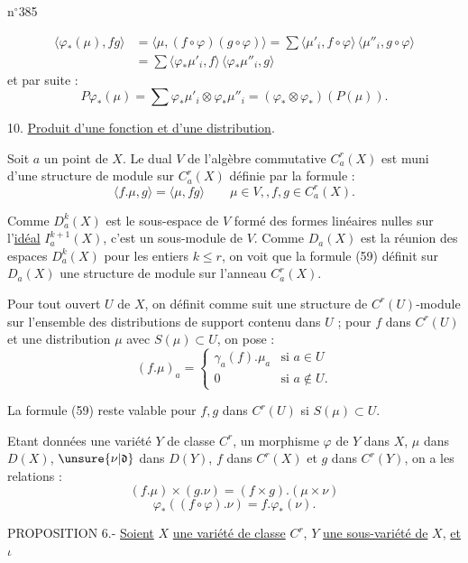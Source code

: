
n$^{\circ}$385

\[
\begin{aligned}
\langle\varphi_*(\mu),fg\rangle&=\langle\mu,(f\circ\varphi)(g\circ\varphi)\rangle=\sum\langle\mu'_i,f\circ\varphi\rangle\,\langle\mu''_i,g\circ\varphi\rangle\\
&=\sum\langle\varphi_*\mu'_i,f\rangle\,\langle\varphi_*\mu''_i,g\rangle
\end{aligned}
\]
et par suite :
\[
P\varphi_*(\mu)=\sum\varphi_*\mu'_i\otimes\varphi_*\mu''_i=(\varphi_*\otimes\varphi_*)(P(\mu)).
\]

10. \uline{Produit d'une fonction et d'une distribution}.

Soit $a$ un point de $X$. Le dual $V$ de l'algèbre commutative $C_a^r(X)$ est muni d'une structure de module sur $C_a^r(X)$ définie par la formule :
\[
\langle f.\mu,g\rangle=\langle\mu,fg\rangle\qquad\mu\in V,,f,g\in C_a^r(X).\tag*{(59)}
\]

Comme $D_a^k(X)$ est le sous-espace de $V$ formé des formes linéaires nulles sur l'\uline{idéal} $I_a^{k+1}(X)$, c'est un sous-module de $V$. Comme $D_a(X)$ est la réunion des espaces $D_a^k(X)$ pour les entiers $k\leq r$, on voit que la formule (59) définit sur $D_a(X)$ une structure de module sur l'anneau $C_a^r(X)$.

Pour tout ouvert $U$ de $X$, on définit comme suit une structure de $C^r(U)$-module sur l'ensemble des distributions de support contenu dans $U$ ; pour $f$ dans $C^r(U)$ et une distribution $\mu$ avec $S(\mu)\subset U$, on pose :
\[
(f.\mu)_a=\begin{cases}
\gamma_a(f).\mu_a & \text{si }a\in U\\
0 & \text{si }a\notin U.
\end{cases}
\]

La formule (59) reste valable pour $f,g$ dans $C^r(U)$ si $S(\mu)\subset U$.

Etant données une variété $Y$ de classe $C^r$, un morphisme $\varphi$ de $Y$ dans $X$, $\mu$ dans $D(X)$, $\unsure{\nu|\mathfrak{d}}$ dans $D(Y)$, $f$ dans $C^r(X)$ et $g$ dans $C^r(Y)$, on a les relations :
\[
(f.\mu)\times(g.\nu)=(f\times g).(\mu\times\nu)\tag*{(60)}
\]
\[
\varphi_*((f\circ\varphi).\nu)=f.\varphi_*(\nu).\tag*{(61)}
\]

PROPOSITION 6.- \uline{Soient} $X$ \uline{une variété de classe} $C^r$, $Y$ \uline{une sous-variété de} $X$, \uline{et} $\iota$
